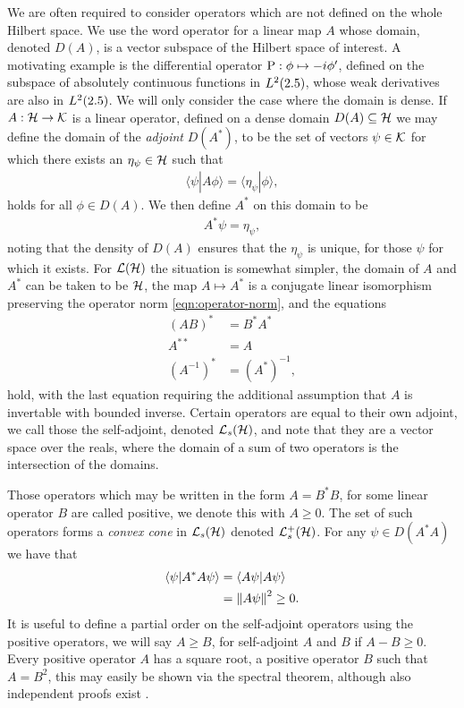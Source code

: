 We are often required to consider operators which are not defined on the whole Hilbert space. We use the word operator for a linear map $A$ whose domain, denoted $D(A)$, is a vector subspace of the Hilbert space of interest. A motivating example is the differential operator $\operatorname{P}:\phi\mapsto -i \phi^\prime$, defined on the subspace of absolutely continuous functions in $L^2(2.5)$, whose weak derivatives are also in $L^2(2.5)$. We will only consider the case where the domain is dense. If $A:\mathcal{H}\to\mathcal{K}$ is a linear operator, defined on a dense domain $D(A)\subseteq \mathcal{H}$ we may define the domain of the \emph{adjoint} $D(A^*)$, to be the set of vectors $\psi \in \mathcal{K}$ for which there exists an $\eta_{\psi}\in \mathcal{H}$ such that
\begin{align}
  \langle \psi | A\phi \rangle  = \langle \eta_{\psi}| \phi\rangle,
\end{align}
holds for all $\phi\in D(A)$. We then define $A^*$ on this domain to be
\begin{align}
  A^* \psi = \eta_{\psi},
\end{align}
noting that the density of $D(A)$ ensures that the $\eta_{\psi}$ is unique, for those $\psi$ for which it exists. For $\bops[\hcal]$ the situation is somewhat simpler, the domain of $A$ and $A^*$ can be taken to be $\mathcal{H}$, the map $A\mapsto A^*$ is a conjugate linear isomorphism preserving the operator norm \eqref{eqn:operator-norm}, and the equations
\begin{align}
  (AB)^* &= B^* A^*\\
  A^{**} &= A\\
  \left(A^{-1}\right)^* &= \left(A^*\right)^{-1},
\end{align}
hold, with the last equation requiring the additional assumption that $A$ is invertable with bounded inverse. Certain operators are equal to their own adjoint, we call those the self-adjoint, denoted $\saops[\hcal]$, and note that they are a vector space over the reals, where the domain of a sum of two operators is the intersection of the domains. 

Those operators which may be written in the form $A = B^*B$, for some linear operator $B$ are called positive, we denote this with $A\geq 0$. The set of such operators forms a \emph{convex  cone} in $\saops[\hcal]$  denoted $\posops[\hcal]$. For any $\psi\in D(A^*A)$ we have that 
\begin{align}
  \langle\psi | A^* A \psi \rangle &= \langle A \psi | A \psi\rangle \\
                                  &= {\left\lVert{A\psi}\right\rVert}^2 \geq 0.
\end{align}
It is useful to define a partial order on the self-adjoint operators using the positive operators, we will say $A\geq B$, for self-adjoint $A$ and $B$ if $A-B\geq 0$. Every positive operator $A$ has a square root, a positive operator $B$ such that $A = B^2$, this may easily be shown via the spectral theorem, although also independent proofs exist .

